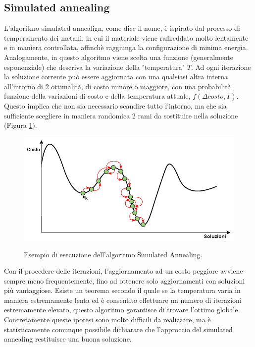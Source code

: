 \subsection{Simulated annealing}%
L'algoritmo simulated annealign, come dice il nome, è ispirato dal processo di temperamento dei metalli, in cui il materiale viene raffreddato molto lentamente e in maniera controllata, affinchè raggiunga la configurazione di minima energia. Analogamente, in questo algoritmo viene scelta una funzione (generalmente esponenziale) che descriva la variazione della "temperatura" $T$. Ad ogni iterazione la soluzione corrente può essere aggiornata con una qualsiasi altra interna all'intorno di 2 ottimalità, di costo minore o maggiore, con una probabilità funzione della variazioni di costo e della temperatura attuale, $f(\Delta costo, T)$. Questo implica che non sia necessario scandire tutto l'intorno, ma che sia sufficiente scegliere in maniera randomica 2 rami da sostituire nella soluzione (Figura \ref{simulated_annealing}).
 \begin{figure}[H] 
\begin{center} 
  \includegraphics[scale=0.6]{Images/simulated_anneling_bianco}\\ 
  \caption{\footnotesize{Esempio di esecuzione dell'algoritmo Simulated Annealing.}}
  \label{simulated_annealing}
\end{center}
\end{figure}
 Con il procedere delle iterazioni, l'aggiornamento ad un costo peggiore avviene sempre meno frequentemente, fino ad ottenere solo aggiornamenti con soluzioni più vantaggiose. Esiste un teorema secondo il quale se la temperatura varia in maniera estremamente lenta ed è consentito effettuare un numero di iterazioni estremamente elevato, questo algoritmo garantisce di trovare l'ottimo globale. Concretamente queste ipotesi sono molto difficili da realizzare, ma è statisticamente comunque possibile dichiarare che l'approccio del simulated annealing restituisce una buona soluzione.

